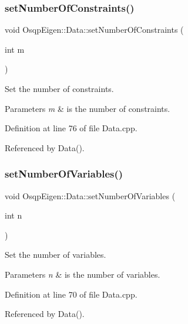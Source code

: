 \subsubsection{\texorpdfstring{set\+Number\+Of\+Constraints()}{setNumberOfConstraints()}}
{\footnotesize\ttfamily void Osqp\+Eigen\+::\+Data\+::set\+Number\+Of\+Constraints (\begin{DoxyParamCaption}\item[{int}]{m }\end{DoxyParamCaption})}



Set the number of constraints. 


\begin{DoxyParams}{Parameters}
{\em m} & is the number of constraints. \\
\hline
\end{DoxyParams}


Definition at line 76 of file Data.\+cpp.



Referenced by Data().

\mbox{\label{classOsqpEigen_1_1Data_abd09d8d70fcbaa8db833b87ca0bcbbab}} 
\subsubsection{\texorpdfstring{set\+Number\+Of\+Variables()}{setNumberOfVariables()}}
{\footnotesize\ttfamily void Osqp\+Eigen\+::\+Data\+::set\+Number\+Of\+Variables (\begin{DoxyParamCaption}\item[{int}]{n }\end{DoxyParamCaption})}



Set the number of variables. 


\begin{DoxyParams}{Parameters}
{\em n} & is the number of variables. \\
\hline
\end{DoxyParams}


Definition at line 70 of file Data.\+cpp.



Referenced by Data().

\mbox{\label{classOsqpEigen_1_1Data_a0c8a933f59793f4ecb92f6b04917d3ac}} 
